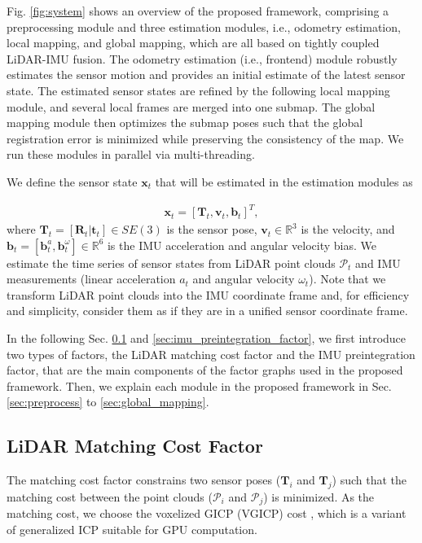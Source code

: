 \documentclass[letterpaper, 10 pt, conference]{ieeeconf}  %
\begin{document}
Fig. \ref{fig:system} shows an overview of the proposed framework, comprising a preprocessing module and three estimation modules, i.e., odometry estimation, local mapping, and global mapping, which are all based on tightly coupled LiDAR-IMU fusion. The odometry estimation (i.e., frontend) module robustly estimates the sensor motion and provides an initial estimate of the latest sensor state. The estimated sensor states are refined by the following local mapping module, and several local frames are merged into one submap. The global mapping module then optimizes the submap poses such that the global registration error is minimized while preserving the consistency of the map. We run these modules in parallel via multi-threading.

We define the sensor state ${\bm x}_t$ that will be estimated in the estimation modules as

\begin{align}
{\bm x}_t = [{\bm T}_t, {\bm v}_t, {\bm b}_t]^T,
\end{align}
where ${\bm T}_t = [{\bm R}_t | {\bm t}_t] \in SE(3)$ is the sensor pose, ${\bm v}_t \in \mathbb{R}^3$ is the velocity, and ${\bm b}_t = [{\bm b}_t^a, {\bm b}_t^{\omega}] \in \mathbb{R}^6$ is the IMU acceleration and angular velocity bias. We estimate the time series of sensor states from LiDAR point clouds $\mathcal{P}_t$ and IMU measurements (linear acceleration $a_t$ and angular velocity $\omega_t$). Note that we transform LiDAR point clouds into the IMU coordinate frame and, for efficiency and simplicity, consider them as if they are in a unified sensor coordinate frame.

In the following Sec. \ref{sec:matching_cost_factor} and \ref{sec:imu_preintegration_factor}, we first introduce two types of factors, the LiDAR matching cost factor and the IMU preintegration factor, that are the main components of the factor graphs used in the proposed framework. Then, we explain each module in the proposed framework in Sec. \ref{sec:preprocess} to \ref{sec:global_mapping}.

\subsection{LiDAR Matching Cost Factor}
\label{sec:matching_cost_factor}

The matching cost factor constrains two sensor poses (${\bm T}_i$ and ${\bm T}_j$) such that the matching cost between the point clouds ($\mathcal{P}_i$ and $\mathcal{P}_j$) is minimized. As the matching cost, we choose the voxelized GICP (VGICP) cost \cite{vgicp}, which is a variant of generalized ICP \cite{Segal2009} suitable for GPU computation. 
\end{document}
